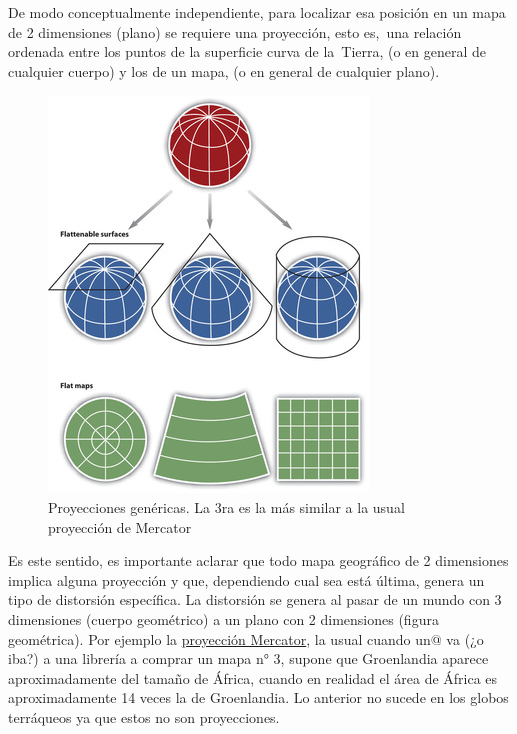 \documentclass[
  letterpaper,
  DIV=11,
  numbers=noendperiod]{scrreprt}
\begin{document}
\begin{tcolorbox}
De modo conceptualmente independiente, para localizar esa posición en un
mapa de 2 dimensiones (plano) se requiere una proyección, esto es,~una
relación ordenada entre los puntos de la superficie curva de la~Tierra,
(o en general de cualquier cuerpo) y los de un mapa, (o en general de
cualquier plano).

\begin{figure}[H]

{\centering \includegraphics{./Inputs/Images/map-projections.jpg}

}

\caption{Proyecciones genéricas. La 3ra es la más similar a la usual
proyección de Mercator}

\end{figure}

Es este sentido, es importante aclarar que todo mapa geográfico de 2
dimensiones implica alguna proyección y que, dependiendo cual sea está
última, genera un tipo de distorsión específica. La distorsión se genera
al pasar de un mundo con 3 dimensiones (cuerpo geométrico) a un plano
con 2 dimensiones (figura geométrica). Por ejemplo la
\href{https://es.wikipedia.org/wiki/Proyecci\%C3\%B3n_de_Mercator}{proyección
Mercator}, la usual cuando un@ va (¿o iba?) a una librería a comprar un
mapa n° 3, supone que Groenlandia aparece aproximadamente del tamaño de
África, cuando en realidad el área de África es aproximadamente 14 veces
la de Groenlandia. Lo anterior no sucede en los globos terráqueos ya que
estos no son proyecciones.

\begin{figure}[H]


\end{figure}
\end{tcolorbox}
\end{document}
